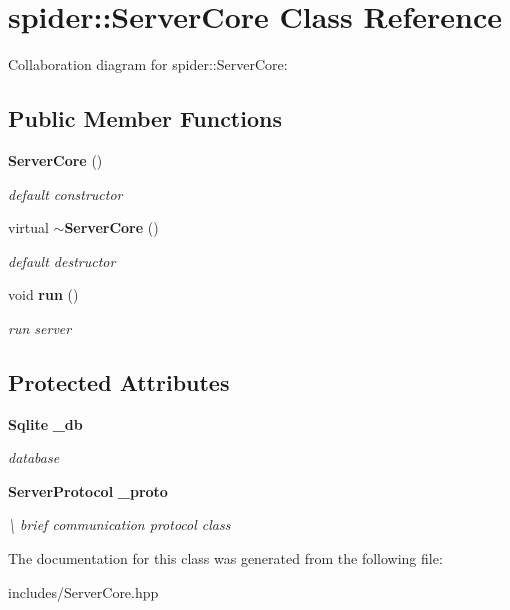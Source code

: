 \section{spider\+:\+:Server\+Core Class Reference}
\label{classspider_1_1_server_core}


Collaboration diagram for spider\+:\+:Server\+Core\+:
\subsection*{Public Member Functions}
\begin{DoxyCompactItemize}
\item 
\mbox{\label{classspider_1_1_server_core_a12254a1286172b54c2e20d613e5e4654}} 
\textbf{ Server\+Core} ()
\begin{DoxyCompactList}\small\item\em default constructor \end{DoxyCompactList}\item 
\mbox{\label{classspider_1_1_server_core_a47006cce5446be55c183bc72602666a7}} 
virtual \textbf{ $\sim$\+Server\+Core} ()
\begin{DoxyCompactList}\small\item\em default destructor \end{DoxyCompactList}\item 
\mbox{\label{classspider_1_1_server_core_a9700fa2c8e439a791dd93a537334c74e}} 
void \textbf{ run} ()
\begin{DoxyCompactList}\small\item\em run server \end{DoxyCompactList}\end{DoxyCompactItemize}
\subsection*{Protected Attributes}
\begin{DoxyCompactItemize}
\item 
\mbox{\label{classspider_1_1_server_core_a14e8b53a65e4868cd7a126bffd2a8ebf}} 
\textbf{ Sqlite} \textbf{ \+\_\+db}
\begin{DoxyCompactList}\small\item\em database \end{DoxyCompactList}\item 
\mbox{\label{classspider_1_1_server_core_a0724bac87db0ae8cad6fed5d1d70a1c5}} 
\textbf{ Server\+Protocol} \textbf{ \+\_\+proto}
\begin{DoxyCompactList}\small\item\em \textbackslash{} brief communication protocol class \end{DoxyCompactList}\end{DoxyCompactItemize}


The documentation for this class was generated from the following file\+:\begin{DoxyCompactItemize}
\item 
includes/Server\+Core.\+hpp\end{DoxyCompactItemize}
